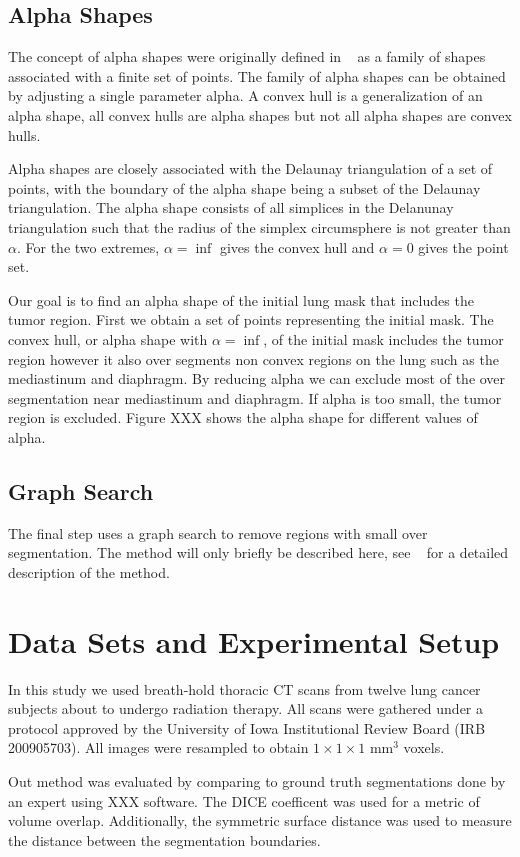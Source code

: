 \documentclass{llncs}
\begin{document}
\subsection{Alpha Shapes}
%
The concept of alpha shapes were originally defined in ~\cite{edelsbrunner1983} as a family of shapes associated with a finite set of points. The family of alpha shapes can be obtained by adjusting a single parameter alpha. A convex hull is a generalization of an alpha shape, all convex hulls are alpha shapes but not all alpha shapes are convex hulls. 

Alpha shapes are closely associated with the Delaunay triangulation of a set of points, with the boundary of the alpha shape being a subset of the Delaunay triangulation. The alpha shape consists of all simplices in the Delanunay triangulation such that the radius of the simplex circumsphere is not greater than $ \alpha $. For the two extremes, $ \alpha=\inf $ gives the convex hull and  $ \alpha=0 $ gives the point set. 

Our goal is to find an alpha shape of the initial lung mask that includes the tumor region. First we obtain a set of points representing the initial mask. The convex hull, or alpha shape with $ \alpha = \inf $, of the initial mask includes the tumor region however it also over segments non convex regions on the lung such as the mediastinum and diaphragm. By reducing alpha we can exclude most of the over segmentation near mediastinum and diaphragm. If alpha is too small, the tumor region is excluded. Figure XXX shows the alpha shape for different values of alpha. 
%
\subsection{Graph Search}
%
The final step uses a graph search to remove regions with small over segmentation. The method will only briefly be described here, see ~\cite{li2006} for a detailed description of the method. 
%
\section{Data Sets and Experimental Setup}
%
In this study we used breath-hold thoracic CT scans from twelve lung cancer subjects about to undergo radiation therapy. All scans were gathered under a protocol approved by the University of Iowa Institutional Review Board (IRB 200905703). All images were resampled to obtain $1\times{}1\times{}1$ mm$^3$ voxels. 

Out method was evaluated by comparing to ground truth segmentations done by an expert using XXX software. The DICE coefficent was used for a metric of volume overlap. Additionally, the symmetric surface distance was used to measure the distance between the segmentation boundaries.  
\end{document}
